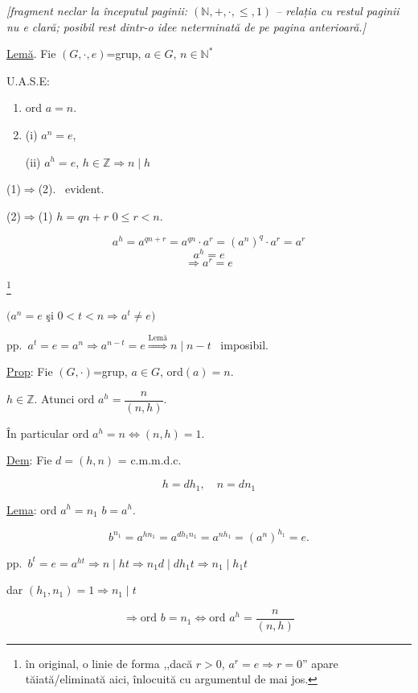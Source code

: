 \documentclass[12pt]{article}
\begin{document}
\noindent\textit{[fragment neclar la începutul paginii: $(\mathbb{N},+,\cdot,\leq,1)$ -- relația cu restul paginii nu e clară; posibil rest dintr-o idee neterminată de pe pagina anterioară.]}

\bigskip
\noindent\underline{Lemă}. Fie $(G,\cdot,e)$=grup, $a\in G$, $n\in\mathbb{N}^*$

\noindent U.A.S.E:

\begin{enumerate}
\item[(1)] ord $a=n$.
\item[(2)] (i) $a^n=e$,

\noindent (ii) $a^h=e$, $h\in\mathbb{Z} \Rightarrow n\mid h$
\end{enumerate}

\bigskip
\noindent (1)$\Rightarrow$(2). \ evident.

\bigskip
\noindent (2)$\Rightarrow$(1) \quad $h=qn+r$ \quad $0\leq r<n$.

\[
a^h = a^{qn+r} = a^{qn}\cdot a^r = (a^n)^q\cdot a^r = a^r
\]
\[
a^h=e
\]
\[
\Rightarrow a^r=e
\]

\noindent\footnote{în original, o linie de forma ,,dacă $r>0$, $a^r=e\Rightarrow r=0$'' apare tăiată/eliminată aici, înlocuită cu argumentul de mai jos.}

\bigskip
\begin{center}
$\big(a^n=e$ şi $0<t<n \Rightarrow a^t\neq e\big)$
\end{center}

\noindent pp.\ $a^t=e=a^n \Rightarrow a^{n-t}=e \overset{\text{Lemă}}{\Longrightarrow} n\mid n-t$ \ imposibil.

\begin{center}
\end{center}

\bigskip
\noindent\underline{Prop}: Fie $(G,\cdot)$=grup, $a\in G$, ord$(a)=n$.

\noindent $h\in\mathbb{Z}$. Atunci ord $a^h = \dfrac{n}{(n,h)}$.

\bigskip
\noindent În particular ord $a^h=n \Leftrightarrow (n,h)=1$.

\bigskip
\noindent\underline{Dem}: Fie $d=(h,n)$ = c.m.m.d.c.

\[
h=dh_1, \quad n=dn_1
\]

\noindent\underline{Lema}: ord $a^h = n_1$ \qquad $b=a^h$.

\[
b^{n_1} = a^{hn_1} = a^{dh_1n_1} = a^{nh_1} = (a^n)^{h_1} = e.
\]

\noindent pp.\ $b^t=e=a^{ht} \Rightarrow n\mid ht \Rightarrow n_1d\mid dh_1t \Rightarrow n_1\mid h_1t$

\noindent dar $(h_1,n_1)=1 \Rightarrow n_1\mid t$

\[
\Rightarrow \text{ord } b=n_1 \Leftrightarrow \text{ord } a^h = \frac{n}{(n,h)}
\]
\end{document}
